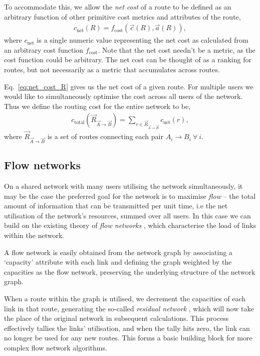 \documentclass[aps,rmp,twocolumn,amsmath,amssymb,nofootinbib,superscriptaddress,longbibliography,floatfix]{revtex4-1}
\begin{document}
To accommodate this, we allow the \emph{net cost} of a route to be defined as an arbitrary function of other primitive cost metrics and attributes of the route,
\begin{align} \label{eq:net_cost_R}
c_\mathrm{net}(R) = f_\mathrm{cost}(\vec{c}(R),\vec{a}(R)),
\end{align}
where $c_\mathrm{net}$ is a single numeric value representing the net cost as calculated from an arbitrary cost function $f_\mathrm{cost}$. Note that the net cost needn't be a metric, as the cost function could be arbitrary. The net cost can be thought of as a ranking for routes, but not necessarily as a metric that accumulates across routes.

Eq.~\ref{eq:net_cost_R} gives us the net cost of a given route. For multiple users we would like to simultaneously optimise the cost across all users of the network. Thus we define the routing cost for the entire network to be,
\begin{align} \label{eq:c_total}
c_\mathrm{total}(\vec{R}_{\vec{A}\to \vec{B}}) = \sum_{r \in {\vec R}_{\vec{A}\to \vec{B}}} c_\mathrm{net}(r),
\end{align}
where $\vec{R}_{\vec{A}\to \vec{B}}$ is a set of routes connecting each pair \mbox{$A_i\to B_i~\forall ~ i$}.

%
%

\subsection{Flow networks} \label{sec:flow_networks}

On a shared network with many users utilising the network simultaneously, it may be the case the preferred goal for the network is to maximise \emph{flow} \cite{???} -- the total amount of information that can be transmitted per unit time, i.e the net utilisation of the network's resources, summed over all users. In this case we can build on the existing theory of \emph{flow networks} \cite{???}, which characterise the load of links within the network.

A flow network is easily obtained from the network graph by associating a `capacity' attribute with each link and defining the graph weighted by the capacities as the flow network, preserving the underlying structure of the network graph.

When a route within the graph is utilised, we decrement the capacities of each link in that route, generating the so-called \emph{residual network} \cite{???}, which will now take the place of the original network in subsequent calculations. This process effectively tallies the links' utilisation, and when the tally hits zero, the link can no longer be used for any new routes. This forms a basic building block for more complex flow network algorithms.
\end{document}
